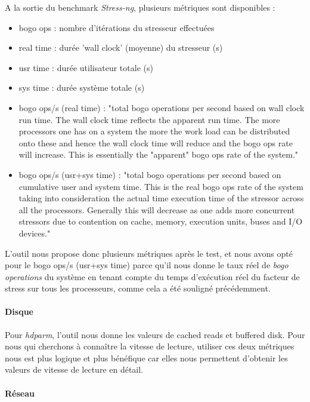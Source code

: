 A la sortie du benchmark \textit{Stress-ng}, plusieurs métriques sont disponibles : 
\begin{itemize}
  \item bogo ops : nombre d'itérations du stresseur effectuées
  \item real time : durée 'wall clock' (moyenne) du stresseur (s)
  \item usr time : durée utilisateur totale (s)
  \item sys time : durée système totale (s)
  \item bogo ops/s (real time) : "total bogo operations per second based on wall clock run time. The wall clock time reflects the apparent run time. The more processors one has on a system the more the work load can be distributed onto these and hence the wall clock time will reduce and the bogo ops rate will increase. This is essentially the "apparent" bogo ops rate of the system."
  \item bogo ops/s (usr+sys time) : "total bogo operations per second based on cumulative user and system time. This is the real bogo ops rate of the system taking into consideration the actual time execution time of the stressor across all the processors. Generally this will decrease as one adds more concurrent stressors due to contention on cache, memory, execution units, buses and I/O devices."
\end{itemize}

L’outil nous propose donc plusieurs métriques après le test, et nous avons opté pour le bogo ops/s (usr+sys time) parce qu’il nous donne le taux réel de \textit{bogo operations} du système en tenant compte du temps d’exécution réel du facteur de stress sur tous les processeurs, comme cela a été souligné précédemment. 

\paragraph{Disque}

Pour \textit{hdparm}, l’outil nous donne les valeurs de cached reads et buffered disk. Pour nous qui cherchons à connaître la vitesse de lecture, utiliser ces deux métriques nous est plus logique et plus bénéfique car elles nous permettent d'obtenir les valeurs de vitesse de lecture en détail.

\paragraph{Réseau}

